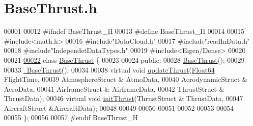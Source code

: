 \hypertarget{_base_thrust_8h_source}{}\section{Base\+Thrust.\+h}
\label{_base_thrust_8h_source}

\begin{DoxyCode}
00001 
00012 \textcolor{preprocessor}{#ifndef BaseThrust\_H}
00013 \textcolor{preprocessor}{#define BaseThrust\_H}
00014 
00015 \textcolor{preprocessor}{#include<math.h>}
00016 \textcolor{preprocessor}{#include"DataCloud.h"}
00017 \textcolor{preprocessor}{#include"readInData.h"}
00018 \textcolor{preprocessor}{#include"IndependetDataTypes.h"}
00019 \textcolor{preprocessor}{#include<Eigen/Dense>}
00020 
00021 
\hyperlink{group___engine}{00022} \textcolor{keyword}{class }\hyperlink{group___engine_class_base_thrust}{BaseThrust} \{
00023 
00024 \textcolor{keyword}{public}:
00028     \hyperlink{group___engine_a19885a6a70bfc4c02e2d8f310af9f22e}{BaseThrust}();
00029 
00033     \hyperlink{group___engine_a554955351c2acfe7a46c00fe056c5c6c}{~BaseThrust}();
00034 
00038     \textcolor{keyword}{virtual} \textcolor{keywordtype}{void} \hyperlink{group___engine_a869359a1b2b7cddcbe5979d6a1cf5eac}{updateThrust}(\hyperlink{group___tools_ga3f1431cb9f76da10f59246d1d743dc2c}{Float64} FlightTime,
00039                         AtmosphereStruct & AtmoData,
00040                         AerodynamicStruct & AeroData,
00041                         AirframeStruct & AirframeData,
00042                         ThrustStruct & ThrustData);
00046     \textcolor{keyword}{virtual} \textcolor{keywordtype}{void} \hyperlink{group___engine_a02b3fe7f763d84c5d34b59f124eaf455}{initThrust}(ThrustStruct & ThrustData,
00047                     AircraftStruct &AircraftData);
00048 
00049 
00050 
00051 
00052 
00053     
00054 
00055 \};
00056 
00057 \textcolor{preprocessor}{#endif  BaseThrust\_H}
\end{DoxyCode}
